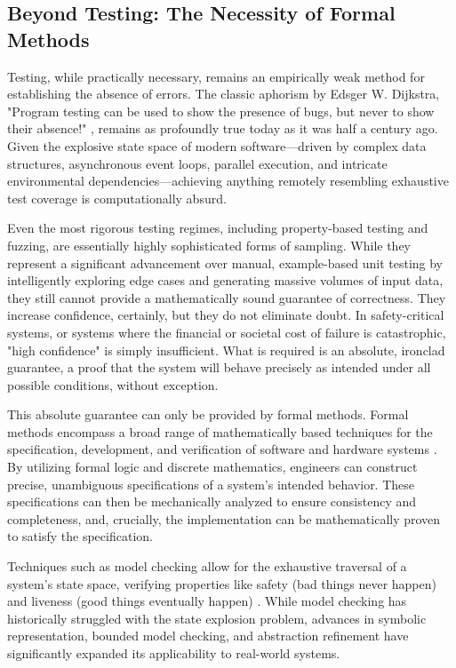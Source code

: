 \subsection{Beyond Testing: The Necessity of Formal Methods}

Testing, while practically necessary, remains an empirically weak method for establishing the absence of errors. The classic aphorism by Edsger W. Dijkstra, "Program testing can be used to show the presence of bugs, but never to show their absence!" \cite{dijkstra1970notes}, remains as profoundly true today as it was half a century ago. Given the explosive state space of modern software—driven by complex data structures, asynchronous event loops, parallel execution, and intricate environmental dependencies—achieving anything remotely resembling exhaustive test coverage is computationally absurd.

Even the most rigorous testing regimes, including property-based testing and fuzzing, are essentially highly sophisticated forms of sampling. While they represent a significant advancement over manual, example-based unit testing by intelligently exploring edge cases and generating massive volumes of input data, they still cannot provide a mathematically sound guarantee of correctness. They increase confidence, certainly, but they do not eliminate doubt. In safety-critical systems, or systems where the financial or societal cost of failure is catastrophic, "high confidence" is simply insufficient. What is required is an absolute, ironclad guarantee, a proof that the system will behave precisely as intended under all possible conditions, without exception.

This absolute guarantee can only be provided by formal methods. Formal methods encompass a broad range of mathematically based techniques for the specification, development, and verification of software and hardware systems \cite{clarke1996formal}. By utilizing formal logic and discrete mathematics, engineers can construct precise, unambiguous specifications of a system's intended behavior. These specifications can then be mechanically analyzed to ensure consistency and completeness, and, crucially, the implementation can be mathematically proven to satisfy the specification.

Techniques such as model checking allow for the exhaustive traversal of a system's state space, verifying properties like safety (bad things never happen) and liveness (good things eventually happen) \cite{baier2008principles}. While model checking has historically struggled with the state explosion problem, advances in symbolic representation, bounded model checking, and abstraction refinement have significantly expanded its applicability to real-world systems. 

